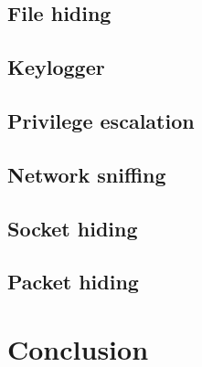 \documentclass{article}
\begin{document}
\subsection{File hiding}
\subsection{Keylogger}
\subsection{Privilege escalation}
\subsection{Network sniffing}
\subsection{Socket hiding}
\subsection{Packet hiding}

\section{Conclusion}

~\cite{Test}
{}

\end{document}
